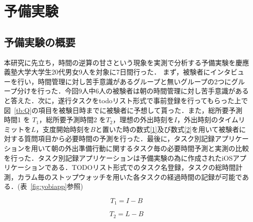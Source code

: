 \documentclass[submit,techrep,noauthor]{ipsj}
\begin{document}
\section{予備実験}
\subsection{予備実験の概要}
本研究に先立ち，時間の逆算の甘さという現象を実測で分析する予備実験を慶應義塾大学大学生20代男女9人を対象に7日間行った．
まず，被験者にインタビューを行い，時間管理に対し苦手意識があるグループと無いグループの2つにグループ分けを行った．今回9人中6人の被験者は朝の時間管理に対し苦手意識があると答えた．次に，遂行タスクをtodoリスト形式で事前登録を行ってもらった上で図~\ref{tb:Q}の項目を被験日時までに被験者に予想して貰った．また，総所要予測時間1 を $T_{1}$，総所要予測時間2 を$T_{2}$，理想の外出時刻を$I$，外出時刻のタイムリミットを$L$，支度開始時刻を$B$と置いた時の数式\ref{1}及び数式\ref{2}を用いて被験者に対する質問項目から必要時間の予測を行った．最後に，タスク別記録アプリケーションを用いて朝の外出準備行動に関するタスク毎の必要時間予測と実測の比較を行った．タスク別記録アプリケーションは予備実験の為に作成されたiOSアプリケーションである．TODOリスト形式でのタスク名登録，タスクの総時間計測，カラム毎のストップウォッチを用いた各タスクの経過時間の記録が可能である．(表~\ref{fig:yobiapp}参照)

\begin{equation}
\label{1}
 T_{1} = I - B 
\end{equation}

\begin{equation}
\label{2}
 T_{2} = L - B
\end{equation}
\end{document}
